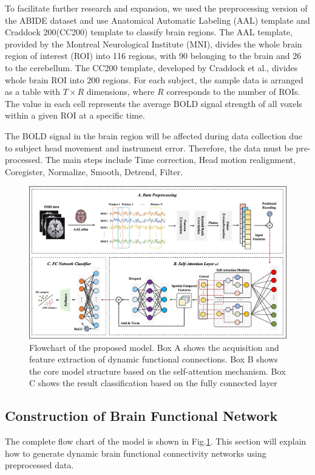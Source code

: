 \documentclass[journal,twoside,web]{ieeecolor}
\begin{document}
To facilitate further research and expansion, we used the preprocessing version of the ABIDE dataset and use Anatomical Automatic Labeling (AAL) template and Craddock 200(CC200) template to classify brain regions\cite{tzourio2002automated, craddock2012whole}. The AAL template, provided by the Montreal Neurological Institute (MNI), divides the whole brain region of interest (ROI) into 116 regions, with 90 belonging to the brain and 26 to the cerebellum. The CC200 template, developed by Craddock et al., divides whole brain ROI into 200 regions. For each subject, the sample data is arranged as a table with $T\times R$ dimensions, where $R$ corresponds to the number of ROIs. The value in each cell represents the average BOLD signal strength of all voxels within a given ROI at a specific time.

The BOLD signal in the brain region will be affected during data collection due to subject head movement and instrument error. Therefore, the data must be pre-processed. The main steps include Time correction, Head motion realignment, Coregister, Normalize, Smooth, Detrend, Filter.
\begin{figure}[t]
	\centering
	\includegraphics[width=\textwidth]{imgs/model.jpg}
	\caption{Flowchart of the proposed model. Box A shows the acquisition and feature extraction of dynamic functional connections. Box B shows the core model structure based on the self-attention mechanism. Box C shows the result classification based on the fully connected layer}
	\label{fig1}
\end{figure} 

\subsection{Construction of Brain Functional Network}
The complete flow chart of the model is shown in Fig.\ref{fig1}. This section will explain how to generate dynamic brain functional connectivity networks using preprocessed data. 
\end{document}
